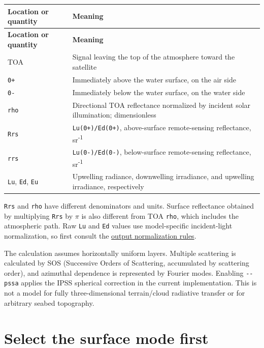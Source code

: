 {\TableFont
\begin{longtable}{@{}>{\raggedright\arraybackslash}p{}>{\raggedright\arraybackslash}p{}@{}}
\toprule
\textbf{Location or quantity} & \textbf{Meaning} \\
\midrule
\endfirsthead
\toprule
\textbf{Location or quantity} & \textbf{Meaning} \\
\midrule
\endhead
\bottomrule
\endfoot
TOA & Signal leaving the top of the atmosphere toward the satellite \\
\texttt{0+} & Immediately above the water surface, on the air side \\
\texttt{0-\allowbreak{}} & Immediately below the water surface, on the water side \\
\texttt{rho} & Directional TOA reflectance normalized by incident solar illumination; dimensionless \\
\texttt{Rrs} & \texttt{Lu(0+)/\allowbreak{}Ed(0+)}, above-surface remote-sensing reflectance, sr\textsuperscript{-}\textsuperscript{1} \\
\texttt{rrs} & \texttt{Lu(0-\allowbreak{})/\allowbreak{}Ed(0-\allowbreak{})}, below-surface remote-sensing reflectance, sr\textsuperscript{-}\textsuperscript{1} \\
\texttt{Lu}, \texttt{Ed}, \texttt{Eu} & Upwelling radiance, downwelling irradiance, and upwelling irradiance, respectively \\
\end{longtable}
}

\texttt{Rrs} and \texttt{rho} have different denominators and units. Surface reflectance obtained by multiplying \texttt{Rrs} by \ensuremath{\pi} is also different from TOA \texttt{rho}, which includes the atmospheric path. Raw \texttt{Lu} and \texttt{Ed} values use model-specific incident-light normalization, so first consult the \hyperref[chap:05_output_formats]{output normalization rules}.

The calculation assumes horizontally uniform layers. Multiple scattering is calculated by SOS (Successive Orders of Scattering, accumulated by scattering order), and azimuthal dependence is represented by Fourier modes. Enabling \texttt{-\allowbreak{}-\allowbreak{}pssa} applies the IPSS spherical correction in the current implementation. This is not a model for fully three-dimensional terrain/cloud radiative transfer or for arbitrary seabed topography.

\section{Select the surface mode first}
\label{sec:auto:01_concepts_geometry:2}

